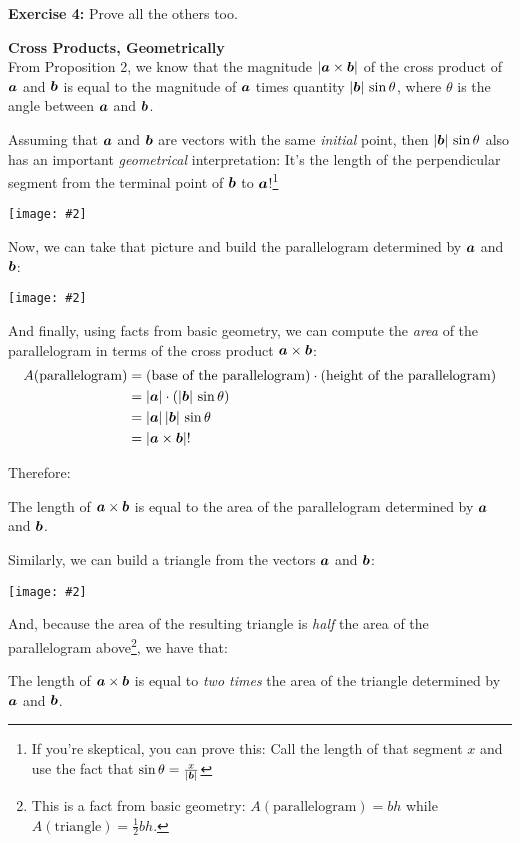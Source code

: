 \documentclass[12pt]{article}
\newcommand{\sectitle}[1]{\vspace{7.5mm}\noindent\textbf{\Large{#1}}\\[3mm]}
\newcommand{\pic}[2]{\begin{center}\texttt{[image: \#2]}\end{center}}
\newcommand{\resultbox}[1]{\begin{center}
		\begin{tcolorbox}[
			enhanced,
			colback=white,
			colframe=black,
			boxrule=0.5pt,
			arc=0pt,
			top=3mm,
			bottom=3mm, 
			width=7in%
			]
			\centering
			#1
		\end{tcolorbox}
\end{center}}
\begin{document}
	\noindent\textbf{Exercise 4:} Prove all the others too.\newpage
	
	\sectitle{Cross Products, Geometrically}
	From Proposition 2, we know that the magnitude $|\boldsymbol{a}\times\boldsymbol{b}|$ of the cross product of $\boldsymbol{a}$ and $\boldsymbol{b}$ is equal to the magnitude of $\boldsymbol{a}$ times quantity $|\boldsymbol{b}|\,\sin\theta$, where $\theta$ is the angle between $\boldsymbol{a}$ and $\boldsymbol{b}$. 
	
	Assuming that $\boldsymbol{a}$ and $\boldsymbol{b}$ are vectors with the same \textit{initial} point, then $|\boldsymbol{b}|\,\sin\theta$ also has an important \textit{geometrical} interpretation: It's the length of the perpendicular segment from the terminal point of $\boldsymbol{b}$ to $\boldsymbol{a}$!\footnote{If you're skeptical, you can prove this: Call the length of that segment $x$ and use the fact that $\sin\theta=\frac{x}{|\boldsymbol{b}|}$}\vspace{-3mm}
	\pic{0.375}{bisector}
	
	Now, we can take that picture and build the parallelogram determined by $\boldsymbol{a}$ and $\boldsymbol{b}$:
	
	\pic{0.375}{parallelogram}
	
	And finally, using facts from basic geometry, we can compute the \textit{area} of the parallelogram in terms of the cross product $\boldsymbol{a}\times\boldsymbol{b}$:
	\begin{align*}
		A(\text{parallelogram}) 
		& = (\text{base of the parallelogram})\cdot(\text{height of the parallelogram})\\
		& = |\boldsymbol{a}|\cdot\left(|\boldsymbol{b}|\,\sin\theta\right)\\
		& = |\boldsymbol{a}|\,|\boldsymbol{b}|\,\sin\theta\\
		& = |\boldsymbol{a}\times\boldsymbol{b}|!
	\end{align*}
	
	\noindent Therefore:
	\resultbox{The length of $\boldsymbol{a}\times\boldsymbol{b}$ is equal to the area of the parallelogram determined by $\boldsymbol{a}$ and $\boldsymbol{b}$.}
	
	\noindent Similarly, we can build a triangle from the vectors $\boldsymbol{a}$ and $\boldsymbol{b}$:
	
	\pic{0.375}{triangle}
	
	\noindent And, because the area of the resulting triangle is \textit{half} the area of the parallelogram above\footnote{This is a fact from basic geometry: $A(\text{parallelogram})=bh$ while $A(\text{triangle})=\frac{1}{2}bh$.}, we have that:
	\resultbox{The length of $\boldsymbol{a}\times\boldsymbol{b}$ is equal to \textit{two times} the area of the triangle determined by $\boldsymbol{a}$ and $\boldsymbol{b}$.}
	
\end{document}
